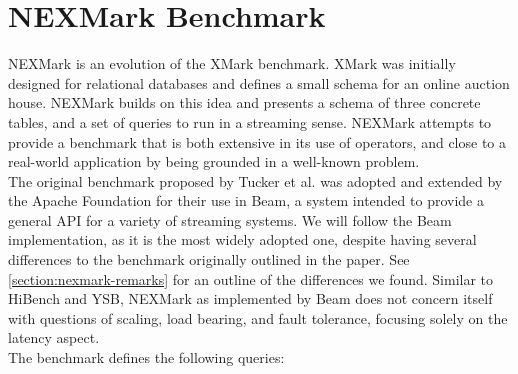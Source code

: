 \section{NEXMark Benchmark}\label{section:nexmark}
NEXMark\cite{nexmark} is an evolution of the XMark benchmark. XMark was initially designed for relational databases and defines a small schema for an online auction house. NEXMark builds on this idea and presents a schema of three concrete tables, and a set of queries to run in a streaming sense. NEXMark attempts to provide a benchmark that is both extensive in its use of operators, and close to a real-world application by being grounded in a well-known problem. \\

The original benchmark proposed by Tucker et al. was adopted and extended by the Apache Foundation for their use in Beam\cite{nexmark-beam}, a system intended to provide a general API for a variety of streaming systems. We will follow the Beam implementation, as it is the most widely adopted one, despite having several differences to the benchmark originally outlined in the paper. See \autoref{section:nexmark-remarks} for an outline of the differences we found. Similar to HiBench and YSB, NEXMark as implemented by Beam does not concern itself with questions of scaling, load bearing, and fault tolerance, focusing solely on the latency aspect. \\

The benchmark defines the following queries:

